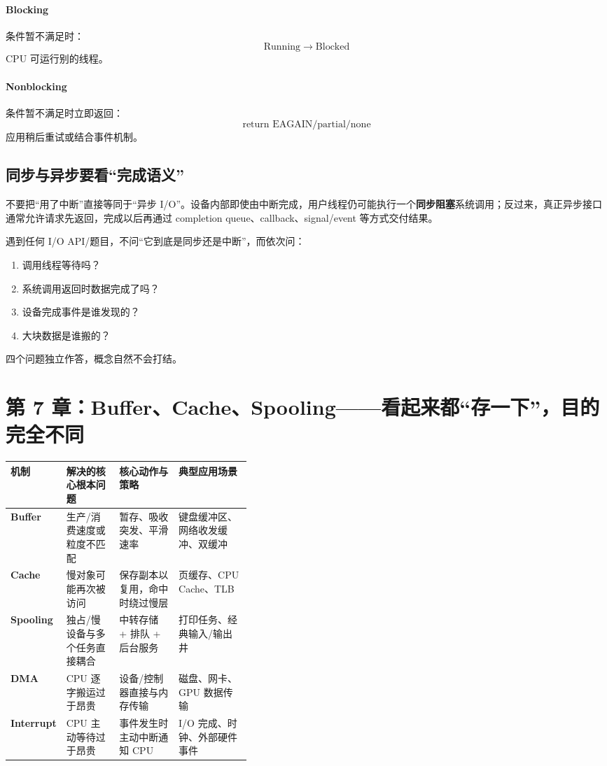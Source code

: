 \documentclass[UTF8,fontset=fandol,11pt,a4paper]{ctexart}
\newcommand{\kw}[1]{\textbf{#1}}
\newcommand{\arr}{\;\longrightarrow\;}
\begin{document}
\paragraph{Blocking}
条件暂不满足时：
\[
\text{Running}\arr\text{Blocked}
\]
CPU 可运行别的线程。

\paragraph{Nonblocking}
条件暂不满足时立即返回：
\[
\text{return EAGAIN/partial/none}
\]
应用稍后重试或结合事件机制。

\subsection{同步与异步要看“完成语义”}
不要把“用了中断”直接等同于“异步 I/O”。设备内部即使由中断完成，用户线程仍可能执行一个\kw{同步阻塞}系统调用；反过来，真正异步接口通常允许请求先返回，完成以后再通过 completion queue、callback、signal/event 等方式交付结果。

\begin{method}[四维判断法]
遇到任何 I/O API/题目，不问“它到底是同步还是中断”，而依次问：
\begin{enumerate}
  \item 调用线程等待吗？
  \item 系统调用返回时数据完成了吗？
  \item 设备完成事件是谁发现的？
  \item 大块数据是谁搬的？
\end{enumerate}
四个问题独立作答，概念自然不会打结。
\end{method}

\section{第 7 章：Buffer、Cache、Spooling——看起来都“存一下”，目的完全不同}

\begingroup
\small
\renewcommand{\arraystretch}{1.25}
\setlength{\tabcolsep}{6pt}
\begin{tabularx}{\linewidth}{>{\bfseries}p{0.18\linewidth} p{0.22\linewidth} X X}
\toprule
机制 & 解决的核心根本问题 & 核心动作与策略 & 典型应用场景 \\
\midrule
Buffer & 生产/消费速度或粒度不匹配 & 暂存、吸收突发、平滑速率 & 键盘缓冲区、网络收发缓冲、双缓冲 \\
Cache & 慢对象可能再次被访问 & 保存副本以复用，命中时绕过慢层 & 页缓存、CPU Cache、TLB \\
Spooling & 独占/慢设备与多个任务直接耦合 & 中转存储 + 排队 + 后台服务 & 打印任务、经典输入/输出井 \\
DMA & CPU 逐字搬运过于昂贵 & 设备/控制器直接与内存传输 & 磁盘、网卡、GPU 数据传输 \\
Interrupt & CPU 主动等待过于昂贵 & 事件发生时主动中断通知 CPU & I/O 完成、时钟、外部硬件事件 \\
\bottomrule
\end{tabularx}
\endgroup
\end{document}
